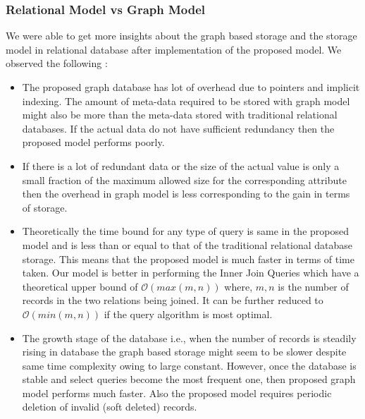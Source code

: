\documentclass[12pt, oneside]{book}
\begin{document}
\subsubsection{Relational Model vs Graph Model}
We were able to get more insights about the graph based storage and the storage model in relational database after implementation of the proposed model. We observed the following :
\begin{itemize}
 \item The proposed graph database has lot of overhead due to pointers and implicit indexing. The amount of meta-data required to be stored with graph model might also be more than the meta-data stored with traditional relational databases. If the actual data do not have sufficient redundancy then the proposed model performs poorly.
 \item If there is a lot of redundant data or the size of the actual value is only a small fraction of the maximum allowed size for the corresponding attribute then the overhead in graph model is less corresponding to the gain in terms of storage.
 \item Theoretically the time bound for any type of query is same in the proposed model and is less than or equal to that of the traditional relational database storage. This means that the proposed model is much faster in terms of time taken. Our model is better in performing the Inner Join Queries which have a theoretical upper bound of $\mathcal{O}(max(m, n))$ where, $m, n$ is the number of records in the two relations being joined. It can be further reduced to $\mathcal{O}(min(m,n))$ if the query algorithm is most optimal.
 \item The growth stage of the database i.e., when the number of records is steadily rising in database the graph based storage might seem to be slower despite same time complexity owing to large constant. However, once the database is stable and select queries become the most frequent one, then proposed graph model performs much faster. Also the proposed model requires periodic deletion of invalid (soft deleted) records.
\end{itemize}
\end{document}
